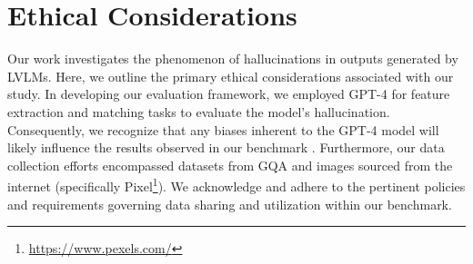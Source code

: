 \section{Ethical Considerations}

Our work investigates the phenomenon of hallucinations in outputs generated by LVLMs. Here, we outline the primary ethical considerations associated with our study. In developing our evaluation framework, we employed GPT-4 for feature extraction and matching tasks to evaluate the model's hallucination. Consequently, we recognize that any biases inherent to the GPT-4 model will likely influence the results observed in our benchmark \cite{Achiam2023GPT4TR,huang2023embrace,qiu-etal-2023-gender,Wang2024NewJN}. Furthermore, our data collection efforts encompassed datasets from GQA and images sourced from the internet (specifically Pixel\footnote{\url{https://www.pexels.com/}}). We acknowledge and adhere to the pertinent policies and requirements governing data sharing and utilization within our benchmark. 